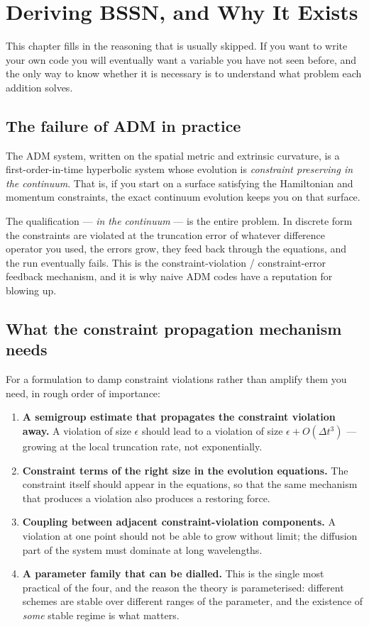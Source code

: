 \section{Deriving BSSN, and Why It Exists}
\label{ch:derive}

This chapter fills in the reasoning that is usually skipped. If you want to
write your own code you will eventually want a variable you have not seen
before, and the only way to know whether it is necessary is to understand what
problem each addition solves.

\subsection{The failure of ADM in practice}

The ADM system, written on the spatial metric and extrinsic curvature, is a
first-order-in-time hyperbolic system whose evolution is
\emph{constraint preserving in the continuum}. That is, if you start on a
surface satisfying the Hamiltonian and momentum constraints, the exact
continuum evolution keeps you on that surface.

The qualification --- \emph{in the continuum} --- is the entire problem. In
discrete form the constraints are violated at the truncation error of whatever
difference operator you used, the errors grow, they feed back through the
equations, and the run eventually fails. This is the constraint-violation /
constraint-error feedback mechanism, and it is why naive ADM codes have a
reputation for blowing up.

\subsection{What the constraint propagation mechanism needs}

For a formulation to damp constraint violations rather than amplify them you
need, in rough order of importance:

\begin{enumerate}
\item \textbf{A semigroup estimate that propagates the constraint violation
      away.} A violation of size $\epsilon$ should lead to a violation of
      size $\epsilon + O(\Delta t^3)$ --- growing at the local truncation rate,
      not exponentially.
\item \textbf{Constraint terms of the right size in the evolution equations.}
      The constraint itself should appear in the equations, so that the same
      mechanism that produces a violation also produces a restoring force.
\item \textbf{Coupling between adjacent constraint-violation components.} A
      violation at one point should not be able to grow without limit; the
      diffusion part of the system must dominate at long wavelengths.
\item \textbf{A parameter family that can be dialled.} This is the single most
      practical of the four, and the reason the theory is parameterised:
      different schemes are stable over different ranges of the parameter, and
      the existence of \emph{some} stable regime is what matters.
\end{enumerate}

